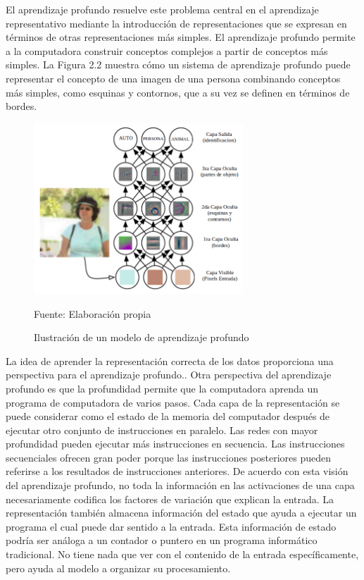 	\vskip 0.4cm 
	El aprendizaje profundo resuelve este problema central en el aprendizaje representativo mediante la introducción de representaciones que se expresan en términos de otras representaciones más simples. El aprendizaje profundo permite a la computadora construir conceptos complejos a partir de conceptos más simples. La Figura 2.2 muestra cómo un sistema de aprendizaje profundo puede representar el concepto de una imagen de una persona combinando conceptos más simples, como esquinas y contornos, que a su vez se definen en términos de bordes.
		\begin{figure}[H]
		\begin{center}
		\includegraphics[width=0.7\textwidth]{images/marcoteorico/deepExam}
		\end{center}
		\begin{center}
		\caption{\small{Ilustración de un modelo de aprendizaje profundo}}
		\vskip -0.25cm
		{\small{Fuente: Elaboración propia}}
		\end{center}
		\vspace{-1.5em}
		\end{figure}
	\vskip 0.4cm 
	La idea de aprender la representación correcta de los datos proporciona una perspectiva para el aprendizaje profundo.\citep{Goodfellow-et-al-2016}. Otra perspectiva del aprendizaje profundo es que la profundidad permite que la computadora aprenda un programa de computadora de varios pasos. Cada capa de la representación se puede considerar como el estado de la memoria del computador después de ejecutar otro conjunto de instrucciones en paralelo. Las redes con mayor profundidad pueden ejecutar más instrucciones en secuencia. Las instrucciones secuenciales ofrecen gran poder porque las instrucciones posteriores pueden referirse a los resultados de instrucciones anteriores. De acuerdo con esta visión del aprendizaje profundo, no toda la información en las activaciones de una capa necesariamente codifica los factores de variación que explican la entrada. La representación también almacena información del estado que ayuda a ejecutar un programa el cual puede dar sentido a la entrada. Esta información de estado podría ser análoga a un contador o puntero en un programa informático tradicional. No tiene nada que ver con el contenido de la entrada específicamente, pero ayuda al modelo a organizar su procesamiento.
